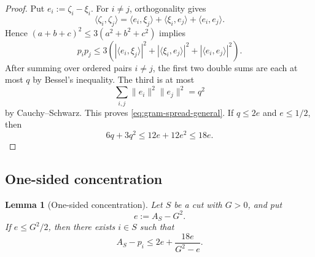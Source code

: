 \documentclass[11pt]{article}
\newtheorem{lemma}[theorem]{Lemma}
\begin{document}
\begin{proof}
Put $e_i:=\zeta_i-\xi_i$.  For $i\ne j$, orthogonality gives
\[
  \langle\zeta_i,\zeta_j\rangle
  =
  \langle e_i,\xi_j\rangle
  +\langle\xi_i,e_j\rangle
  +\langle e_i,e_j\rangle.
\]
Hence $(a+b+c)^2\le3(a^2+b^2+c^2)$ implies
\[
  p_ip_j
  \le
  3\left(
    |\langle e_i,\xi_j\rangle|^2+
    |\langle\xi_i,e_j\rangle|^2+
    |\langle e_i,e_j\rangle|^2
  \right).
\]
After summing over ordered pairs $i\ne j$, the first two double sums are each
at most $q$ by Bessel's inequality.  The third is at most
\[
  \sum_{i,j}\|e_i\|^2\|e_j\|^2=q^2
\]
by Cauchy--Schwarz.  This proves \eqref{eq:gram-spread-general}.  If
$q\le2e$ and $e\le1/2$, then
\[
  6q+3q^2\le12e+12e^2\le18e.
\]
\end{proof}

\subsection{One-sided concentration}

\begin{lemma}[One-sided concentration]\label{lem:onesided}
Let $S$ be a cut with $G>0$, and put
\[
  e:=A_S-G^2.
\]
If $e\le G^2/2$, then there exists $i\in S$ such that
\begin{equation}\label{eq:onesided}
  A_S-p_i
  \le
  2e+\frac{18e}{G^2-e}.
\end{equation}
\end{lemma}
\end{document}
